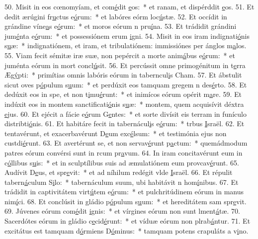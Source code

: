 50. Misit in eos cœnomyíam, et com\uline{é}dit \uline{e}os:~* et ranam, et dispérddit \uline{e}os.
51. Et dedit ærúgini fr\uline{u}ctus e\uline{ó}rum:~* et labóres eórm loc\uline{ú}stæ.
52. Et occídit in grándine víne\uline{a}s e\uline{ó}rum:~* et moros eórum n pru\uline{í}na.
53. Et trádidit grándini jum\uline{é}nta e\uline{ó}rum:~* et possessiónem erum \uline{i}gni.
54. Misit in eos iram indignati\uline{ó}nis s\uline{u}æ:~* indignatiónem, et iram, et tribulatiónem: immissiónes per ánglos m\uline{a}los.
55. Viam fecit sémitæ iræ suæ, non pepércit a morte anim\uline{á}bus e\uline{ó}rum:~* et juménta eórum in mort concl\uline{ú}sit.
56. Et percússit omne primogénitum in t\uline{e}rra Æg\uline{ý}pti:~* primítias omnis labóris eórum in taberncul\uline{i}s Cham.
57. Et ábstulit sicut oves p\uline{ó}pulum s\uline{u}um:~* et perdúxit eos tamquam gregem n des\uline{é}rto.
58. Et dedúxit eos in spe, et non t\uline{i}mu\uline{é}runt:~* et inimícos eórum opérit m\uline{a}re.
59. Et indúxit eos in montem sanctificati\uline{ó}nis s\uline{u}æ:~* montem, quem acquisívit déxtra \uline{e}jus.
60. Et ejécit a fácie e\uline{ó}rum G\uline{e}ntes:~* et sorte divísit eis terram in funículo distribti\uline{ó}nis.
61. Et habitáre fecit in tabernácul\uline{i}s e\uline{ó}rum:~* trbus \uline{I}sraël.
62. Et tentavérunt, et exacerbavérunt D\uline{e}um exc\uline{é}lsum:~* et testimónia ejus non custdi\uline{é}runt.
63. Et avertérunt se, et non servav\uline{é}runt p\uline{a}ctum:~* quemádmodum patres eórum convérsi sunt in rcum pr\uline{a}vum.
64. In iram concitavérunt eum in c\uline{ó}llibus s\uline{u}is:~* et in sculptílibus suis ad æmulatiónem eum provcav\uline{é}runt.
65. Audívit D\uline{e}us, et spr\uline{e}vit:~* et ad níhilum redégit vlde \uline{I}sraël.
66. Et répulit tabern\uline{á}culum S\uline{i}lo:~* tabernáculum suum, ubi habitávit n hom\uline{í}nibus.
67. Et trádidit in captivitátem virt\uline{ú}tem e\uline{ó}rum:~* et pulchritúdinem eórum in manus nim\uline{í}ci.
68. Et conclúsit in gládio p\uline{ó}pulum s\uline{u}um:~* et hereditátem sam spr\uline{e}vit.
69. Júvenes eórum com\uline{é}dit \uline{i}gnis:~* et vírgines eórum non sunt lment\uline{á}tæ.
70. Sacerdótes eórum in gládio c\uline{e}cid\uline{é}runt:~* et víduæ eórum non plrab\uline{á}ntur.
71. Et excitátus est tamquam d\uline{ó}rmiens D\uline{ó}minus:~* tamquam potens crapuláts a v\uline{i}no.
